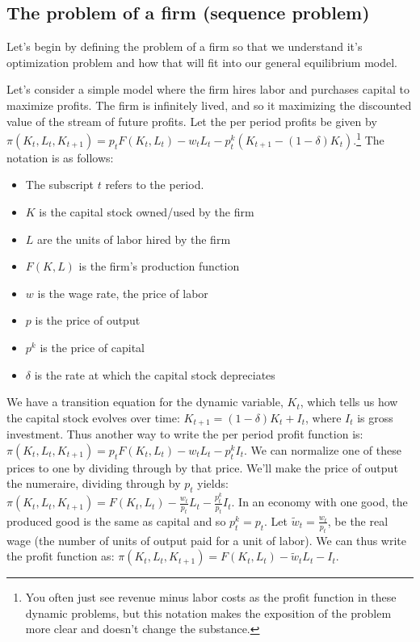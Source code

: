 \documentclass[letterpaper,12pt]{article}
\theoremstyle{definition}
\begin{document}
\begin{spacing}{1.5}
\subsection*{The problem of a firm (sequence problem)}

Let's begin by defining the problem of a firm so that we understand it's optimization problem and how that will fit into our general equilibrium model.

Let's consider a simple model where the firm hires labor and purchases capital to maximize profits.  The firm is infinitely lived, and so it maximizing the discounted value of the stream of future profits.  Let the per period profits be given by $\pi(K_{t},L_{t},K_{t+1}) = p_{t}F(K_{t},L_{t}) - w_{t}L_{t} - p^{k}_{t}(K_{t+1} - (1-\delta)K_{t})$.\footnote{You often just see revenue minus labor costs as the profit function in these dynamic problems, but this notation makes the exposition of the problem more clear and doesn't change the substance.}  The notation is as follows:
\begin{itemize}
\item The subscript $t$ refers to the period. 
\item $K$ is the capital stock owned/used by the firm
\item $L$ are the units of labor hired by the firm
\item $F(K,L)$ is the firm's production function
\item $w$ is the wage rate, the price of labor
\item $p$ is the price of output
\item $p^{k}$ is the price of capital
\item $\delta$ is the rate at which the capital stock depreciates
\end{itemize}

We have a transition equation for the dynamic variable, $K_{t}$, which tells us how the capital stock evolves over time: $K_{t+1} = (1-\delta)K_{t} + I_{t}$, where $I_{t}$ is gross investment. Thus another way to write the per period profit function is: $\pi(K_{t},L_{t},K_{t+1}) = p_{t}F(K_{t},L_{t}) - w_{t}L_{t} - p^{k}_{t}I_{t}$.  We can normalize one of these prices to one by dividing through by that price.  We'll make the price of output the numeraire, dividing through by $p_{t}$ yields: $\pi(K_{t},L_{t},K_{t+1}) = F(K_{t},L_{t}) - \frac{w_{t}}{p_{t}}L_{t} - \frac{p^{k}_{t}}{p_{t}}I_{t}$.  In an economy with one good, the produced good is the same as capital and so $p^{k}_{t}=p_{t}$.   Let $\tilde{w}_{t}=\frac{w_{t}}{p_{t}}$, be the real wage (the number of units of output paid for a unit of labor).  We can thus write the profit function as: $\pi(K_{t},L_{t},K_{t+1}) = F(K_{t},L_{t}) - \tilde{w}_{t}L_{t} - I_{t}$.


\end{spacing}
\end{document}
